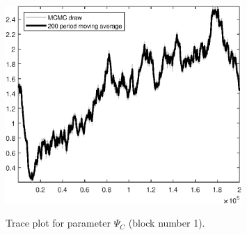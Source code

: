 \begin{figure}[H]
\centering
  \includegraphics[width=0.8\textwidth]{BRS_sectoral_rest/graphs/TracePlot_Psi_C_blck_1}\\
    \caption{Trace plot for parameter ${\Psi_C}$ (block number 1).}
\end{figure}
